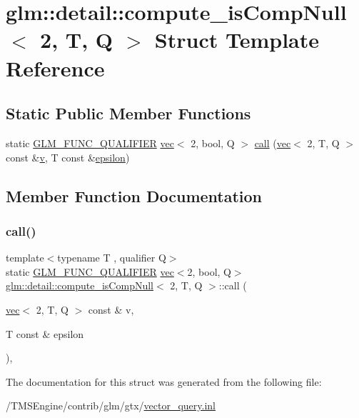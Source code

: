 \hypertarget{structglm_1_1detail_1_1compute__is_comp_null_3_012_00_01_t_00_01_q_01_4}{}\section{glm\+:\+:detail\+:\+:compute\+\_\+is\+Comp\+Null$<$ 2, T, Q $>$ Struct Template Reference}
\label{structglm_1_1detail_1_1compute__is_comp_null_3_012_00_01_t_00_01_q_01_4}
\subsection*{Static Public Member Functions}
\begin{DoxyCompactItemize}
\item 
static \hyperlink{setup_8hpp_a33fdea6f91c5f834105f7415e2a64407}{G\+L\+M\+\_\+\+F\+U\+N\+C\+\_\+\+Q\+U\+A\+L\+I\+F\+I\+ER} \hyperlink{structglm_1_1vec}{vec}$<$ 2, bool, Q $>$ \hyperlink{structglm_1_1detail_1_1compute__is_comp_null_3_012_00_01_t_00_01_q_01_4_acec5e6ad7a0200dcbc038f9efcd97a36}{call} (\hyperlink{structglm_1_1vec}{vec}$<$ 2, T, Q $>$ const \&\hyperlink{_s_d_l__opengl_8h_a10a82eabcb59d2fcd74acee063775f90}{v}, T const \&\hyperlink{group__gtc__constants_ga2a1e57fc5592b69cfae84174cbfc9429}{epsilon})
\end{DoxyCompactItemize}


\subsection{Member Function Documentation}
\mbox{\label{structglm_1_1detail_1_1compute__is_comp_null_3_012_00_01_t_00_01_q_01_4_acec5e6ad7a0200dcbc038f9efcd97a36}} 
\subsubsection{\texorpdfstring{call()}{call()}}
{\footnotesize\ttfamily template$<$typename T , qualifier Q$>$ \\
static \hyperlink{setup_8hpp_a33fdea6f91c5f834105f7415e2a64407}{G\+L\+M\+\_\+\+F\+U\+N\+C\+\_\+\+Q\+U\+A\+L\+I\+F\+I\+ER} \hyperlink{structglm_1_1vec}{vec}$<$2, bool, Q$>$ \hyperlink{structglm_1_1detail_1_1compute__is_comp_null}{glm\+::detail\+::compute\+\_\+is\+Comp\+Null}$<$ 2, T, Q $>$\+::call (\begin{DoxyParamCaption}\item[{\hyperlink{structglm_1_1vec}{vec}$<$ 2, T, Q $>$ const \&}]{v,  }\item[{T const \&}]{epsilon }\end{DoxyParamCaption})\hspace{0.3cm}{\ttfamily [inline]}, {\ttfamily [static]}}



The documentation for this struct was generated from the following file\+:\begin{DoxyCompactItemize}
\item 
/\+T\+M\+S\+Engine/contrib/glm/gtx/\hyperlink{vector__query_8inl}{vector\+\_\+query.\+inl}\end{DoxyCompactItemize}
